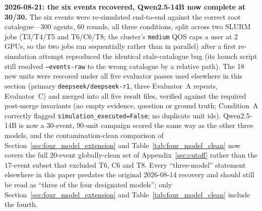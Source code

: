 \documentclass[11pt,journal,onecolumn]{IEEEtran}
\begin{document}
\textbf{2026-08-21: the six events recovered, Qwen2.5-14B now complete at 30/30.} The six events were re-simulated end-to-end against the correct root catalogue---300 agents, 60 rounds, all three conditions, split across two SLURM jobs (T3/T4/T5 and T6/C6/T8; the cluster's \texttt{medium} QOS caps a user at 2 GPUs, so the two jobs ran sequentially rather than in parallel) after a first re-simulation attempt reproduced the identical stale-catalogue bug (its launch script still resolved \texttt{--events-raw} to the wrong catalogue by a relative path). The 18 new units were rescored under all five evaluator passes used elsewhere in this section (primary \texttt{deepseek/deepseek-r1}, three Evaluator~A repeats, Evaluator~C) and merged into all five result files, verified against the required post-merge invariants (no empty evidence, question or ground truth; Condition~A correctly flagged \texttt{simulation\_executed=False}; no duplicate unit ids). Qwen2.5-14B is now a $30$-event, $90$-unit campaign scored the same way as the other three models, and the contamination-clean comparison of Section~\ref{sec:four_model_extension} and Table~\ref{tab:four_model_clean} now covers the full $20$-event globally-clean set of Appendix~\ref{sec:cutoff} rather than the $17$-event subset that excluded T6, C6 and T8. Every ``three-model'' statement elsewhere in this paper predates the original 2026-08-14 recovery and should still be read as ``three of the four designated models''; only Section~\ref{sec:four_model_extension} and Table~\ref{tab:four_model_clean} include the fourth.
\end{document}
